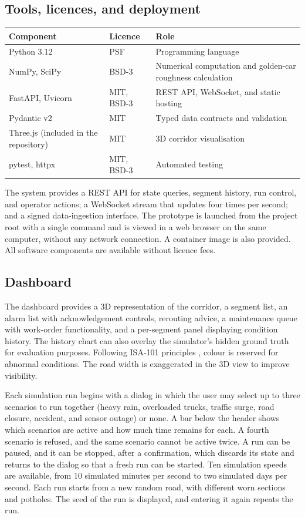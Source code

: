 \documentclass[11pt,a4paper]{article}
\begin{document}
\subsection{Tools, licences, and deployment}
\begin{center}
\small
\begin{tabularx}{\textwidth}{@{}L{3.6cm} L{2.6cm} X@{}}
\toprule
\textbf{Component} & \textbf{Licence} & \textbf{Role}\\
\midrule
Python 3.12 & PSF & Programming language\\
NumPy, SciPy & BSD-3 & Numerical computation and golden-car roughness calculation\\
FastAPI, Uvicorn & MIT, BSD-3 & REST API, WebSocket, and static hosting\\
Pydantic v2 & MIT & Typed data contracts and validation\\
Three.js (included in the repository) & MIT & 3D corridor visualisation\\
pytest, httpx & MIT, BSD-3 & Automated testing\\
\bottomrule
\end{tabularx}
\end{center}

The system provides a REST API for state queries, segment history, run control, and operator actions; a WebSocket stream that updates four times per second; and a signed data-ingestion interface. The prototype is launched from the project root with a single command and is viewed in a web browser on the same computer, without any network connection. A container image is also provided. All software components are available without licence fees.

\subsection{Dashboard}
The dashboard provides a 3D representation of the corridor, a segment list, an alarm list with acknowledgement controls, rerouting advice, a maintenance queue with work-order functionality, and a per-segment panel displaying condition history. The history chart can also overlay the simulator's hidden ground truth for evaluation purposes. Following ISA-101 principles \cite{isa101}, colour is reserved for abnormal conditions. The road width is exaggerated in the 3D view to improve visibility.

Each simulation run begins with a dialog in which the user may select up to three scenarios to run together (heavy rain, overloaded trucks, traffic surge, road closure, accident, and sensor outage) or none. A bar below the header shows which scenarios are active and how much time remains for each. A fourth scenario is refused, and the same scenario cannot be active twice. A run can be paused, and it can be stopped, after a confirmation, which discards its state and returns to the dialog so that a fresh run can be started. Ten simulation speeds are available, from 10 simulated minutes per second to two simulated days per second. Each run starts from a new random road, with different worn sections and potholes. The seed of the run is displayed, and entering it again repeats the run.
\end{document}

